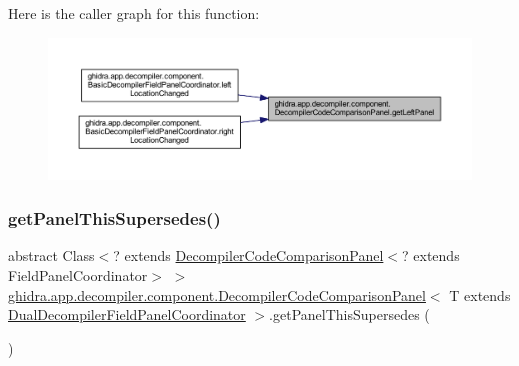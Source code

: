 Here is the caller graph for this function\+:
\nopagebreak
\begin{figure}[H]
\begin{center}
\leavevmode
\includegraphics[width=350pt]{classghidra_1_1app_1_1decompiler_1_1component_1_1_decompiler_code_comparison_panel_a61f49d43d10e1532c9bcd45cafca58b4_icgraph}
\end{center}
\end{figure}
\mbox{\label{classghidra_1_1app_1_1decompiler_1_1component_1_1_decompiler_code_comparison_panel_a1554f1f99dea8c841b875f0c6a2cb64b}} 
\subsubsection{\texorpdfstring{getPanelThisSupersedes()}{getPanelThisSupersedes()}}
{\footnotesize\ttfamily abstract Class$<$? extends \mbox{\hyperlink{classghidra_1_1app_1_1decompiler_1_1component_1_1_decompiler_code_comparison_panel}{Decompiler\+Code\+Comparison\+Panel}}$<$? extends Field\+Panel\+Coordinator$>$ $>$ \mbox{\hyperlink{classghidra_1_1app_1_1decompiler_1_1component_1_1_decompiler_code_comparison_panel}{ghidra.\+app.\+decompiler.\+component.\+Decompiler\+Code\+Comparison\+Panel}}$<$ T extends \mbox{\hyperlink{classghidra_1_1app_1_1decompiler_1_1component_1_1_dual_decompiler_field_panel_coordinator}{Dual\+Decompiler\+Field\+Panel\+Coordinator}} $>$.get\+Panel\+This\+Supersedes (\begin{DoxyParamCaption}{ }\end{DoxyParamCaption})\hspace{0.3cm}{\ttfamily [abstract]}}

